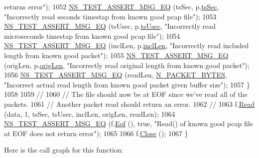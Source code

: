 \begin{DoxyCode}
{       returns error"});
1052       \hyperlink{group__testing_ga2a9d78cffb3db8e867c35fff0b698cf5}{NS\_TEST\_ASSERT\_MSG\_EQ} (tsSec, p.\hyperlink{structPACKET__ENTRY_abea31e5c174a03ab6359271d6f63a648}{tsSec}, \textcolor{stringliteral}{"Incorrectly read seconds timestap
       from known good pcap file"});
1053       \hyperlink{group__testing_ga2a9d78cffb3db8e867c35fff0b698cf5}{NS\_TEST\_ASSERT\_MSG\_EQ} (tsUsec, p.\hyperlink{structPACKET__ENTRY_a0c46e357bf2e2eec6d097408062f3cf1}{tsUsec}, \textcolor{stringliteral}{"Incorrectly read microseconds
       timestap from known good pcap file"});
1054       \hyperlink{group__testing_ga2a9d78cffb3db8e867c35fff0b698cf5}{NS\_TEST\_ASSERT\_MSG\_EQ} (inclLen, p.\hyperlink{structPACKET__ENTRY_ae8dd8133096a6da388506261df58ff01}{inclLen}, \textcolor{stringliteral}{"Incorrectly read included
       length from known good packet"});
1055       \hyperlink{group__testing_ga2a9d78cffb3db8e867c35fff0b698cf5}{NS\_TEST\_ASSERT\_MSG\_EQ} (origLen, p.\hyperlink{structPACKET__ENTRY_a2eb0d1882b86fd106ad82d3138273004}{origLen}, \textcolor{stringliteral}{"Incorrectly read original
       length from known good packet"});
1056       \hyperlink{group__testing_ga2a9d78cffb3db8e867c35fff0b698cf5}{NS\_TEST\_ASSERT\_MSG\_EQ} (readLen, \hyperlink{pcap-file-test-suite_8cc_afbd70e37403299f8c72166deb34c04c3}{N\_PACKET\_BYTES}, \textcolor{stringliteral}{"Incorrect actual
       read length from known good packet given buffer size"});
1057     \}
1058 
1059   \textcolor{comment}{//}
1060   \textcolor{comment}{// The file should now be at EOF since we've read all of the packets.}
1061   \textcolor{comment}{// Another packet read should return an error.}
1062   \textcolor{comment}{//}
1063   f.\hyperlink{classns3_1_1PcapFile_a18c5045735408fe45a8cbc9e6b34a4fb}{Read} (data, 1, tsSec, tsUsec, inclLen, origLen, readLen);
1064   \hyperlink{group__testing_ga2a9d78cffb3db8e867c35fff0b698cf5}{NS\_TEST\_ASSERT\_MSG\_EQ} (f.\hyperlink{classns3_1_1PcapFile_ad8b9cd552beb5e1c348e04c98d3daffa}{Eof} (), \textcolor{keyword}{true}, \textcolor{stringliteral}{"Read() of known good pcap file at EOF
       does not return error"});
1065 
1066   f.\hyperlink{classns3_1_1PcapFile_ad3b6c28d464742ee1fa3a64628339a5b}{Close} ();
1067 \}
\end{DoxyCode}


Here is the call graph for this function\+:


